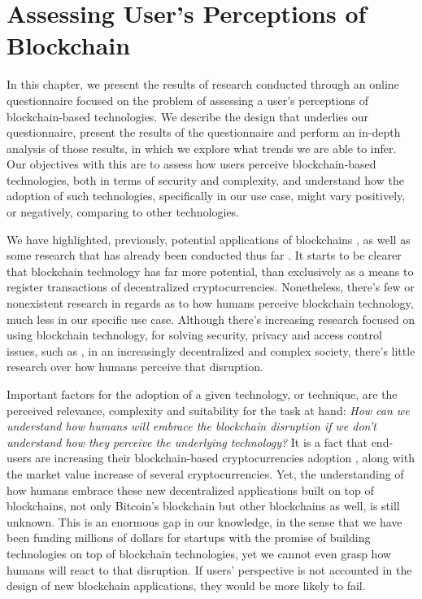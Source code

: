 \chapter{Assessing User's Perceptions of Blockchain}
\label{chap:study}

In this chapter, we present the results of research conducted through an online questionnaire focused on the problem of assessing a user's perceptions of blockchain-based technologies. We describe the design that underlies our questionnaire, present the results of the questionnaire and perform an in-depth analysis of those results, in which we explore what trends we are able to infer. Our objectives with this are to assess how users perceive blockchain-based technologies, both in terms of security and complexity, and understand how the adoption of such technologies, specifically in our use case, might vary positively, or negatively, comparing to other technologies.

We have highlighted, previously, potential applications of blockchains \cite{pilkington_blockchain_2016, crosby_blockchain_2016, underwood_blockchain_2016}, as well as some research that has already been conducted thus far \cite{biswas_securing_2016, ouaddah_fairaccess:_2017, fotiou_decentralized_2016}. It starts to be clearer that blockchain technology has far more potential, than exclusively as a means to register transactions of decentralized cryptocurrencies. Nonetheless, there's few or nonexistent research in regards as to how humans perceive blockchain technology, much less in our specific use case. Although there's increasing research focused on using blockchain technology, for solving security, privacy and access control issues, such as \cite{maesa_blockchain_2017, ouaddah_access_2017, dorri_blockchain_2017, yue_healthcare_2016}, in an increasingly decentralized and complex society, there's little research over how humans perceive that disruption.

Important factors for the adoption of a given technology, or technique, are the perceived relevance, complexity and suitability for the task at hand: \emph{How can we understand how humans will embrace the blockchain disruption if we don't understand how they perceive the underlying technology?} It is a fact that end-users are increasing their blockchain-based cryptocurrencies adoption \cite{bloomberg_crypto_central} \cite{bloomberg_crypto_altcoins} \cite{nyt_crypto_buble}, along with the market value increase of several cryptocurrencies. Yet, the understanding of how humans embrace these new decentralized applications built on top of blockchains, not only Bitcoin's blockchain but other blockchains as well, is still unknown. This is an enormous gap in our knowledge, in the sense that we have been funding millions of dollars for startups with the promise of building technologies on top of blockchain technologies, yet we cannot even grasp how humans will react to that disruption. If users' perspective is not accounted in the design of new blockchain applications, they would be more likely to fail.

